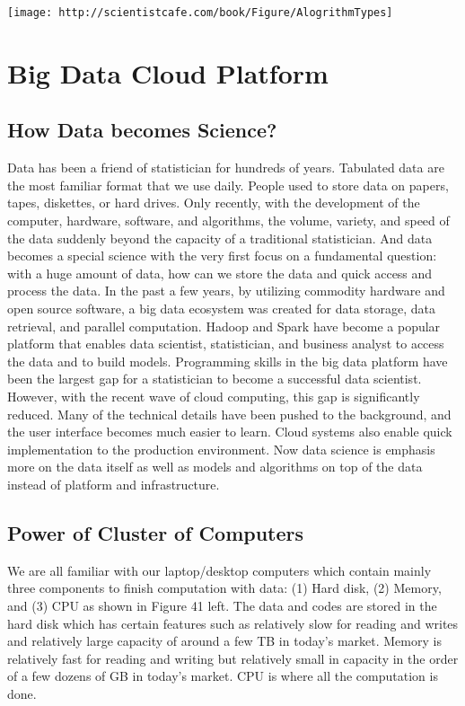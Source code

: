 \documentclass[]{book}
\theoremstyle{definition}
\theoremstyle{definition}
\theoremstyle{remark}
\begin{document}
\texttt{[image: http://scientistcafe.com/book/Figure/AlogrithmTypes]}

\chapter{Big Data Cloud Platform}\label{big-data-cloud-platform}

\section{How Data becomes Science?}\label{how-data-becomes-science}

Data has been a friend of statistician for hundreds of years. Tabulated
data are the most familiar format that we use daily. People used to
store data on papers, tapes, diskettes, or hard drives. Only recently,
with the development of the computer, hardware, software, and
algorithms, the volume, variety, and speed of the data suddenly beyond
the capacity of a traditional statistician. And data becomes a special
science with the very first focus on a fundamental question: with a huge
amount of data, how can we store the data and quick access and process
the data. In the past a few years, by utilizing commodity hardware and
open source software, a big data ecosystem was created for data storage,
data retrieval, and parallel computation. Hadoop and Spark have become a
popular platform that enables data scientist, statistician, and business
analyst to access the data and to build models. Programming skills in
the big data platform have been the largest gap for a statistician to
become a successful data scientist. However, with the recent wave of
cloud computing, this gap is significantly reduced. Many of the
technical details have been pushed to the background, and the user
interface becomes much easier to learn. Cloud systems also enable quick
implementation to the production environment. Now data science is
emphasis more on the data itself as well as models and algorithms on top
of the data instead of platform and infrastructure.

\section{Power of Cluster of
Computers}\label{power-of-cluster-of-computers}

We are all familiar with our laptop/desktop computers which contain
mainly three components to finish computation with data: (1) Hard disk,
(2) Memory, and (3) CPU as shown in Figure 41 left. The data and codes
are stored in the hard disk which has certain features such as
relatively slow for reading and writes and relatively large capacity of
around a few TB in today's market. Memory is relatively fast for reading
and writing but relatively small in capacity in the order of a few
dozens of GB in today's market. CPU is where all the computation is
done.
\end{document}
